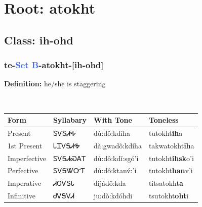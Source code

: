 \needspace{4in}
\section*{Root: atokht}
\nopagebreak
{}
\needspace{3in}
\subsection*{Class: ih-ohd}
\nopagebreak
\needspace{2in}
\subsubsection*{te{-}\textcolor{RoyalBlue}{Set B}{-}\textbf{atokht}{-}[ih-ohd]}
\nopagebreak
\textbf{Definition: } he/she is staggering
\\[0.5em]
\begin{tabularx}{\textwidth}{l X X X}%
\toprule%
\textbf{Form}&\textbf{Syllabary}&\textbf{With Tone}&\textbf{Toneless}\\%
\midrule%
Present&ᏚᏙᎦᏗᎭ&dù:dô:kdíha&tutokht\textbf{ih}a\\%
1st Present&ᏓᏆᏙᎦᏗᎭ&dà:gwadô:kdíha&takwatokht\textbf{ih}a\\%
Imperfective&ᏚᏙᎦᏗᏍᎪᎢ&dù:dô:kdǐ:sgó’i&tutokht\textbf{ihsk}o'i\\%
Perfective&ᏚᏙᎦᏔᏅᎢ&dù:dô:ktanv́:’i&tutokht\textbf{han}v'i\\%
Imperative&ᏗᏣᏙᎦᏓ&dijádô:kda&titsatokht\textbf{a}\\%
Infinitive&ᏧᏙᎦᏙᏗ&ju:dò:kdóhdi&tsutokht\textbf{oht}i\\%
\bottomrule%
\end{tabularx}
\\[1em]